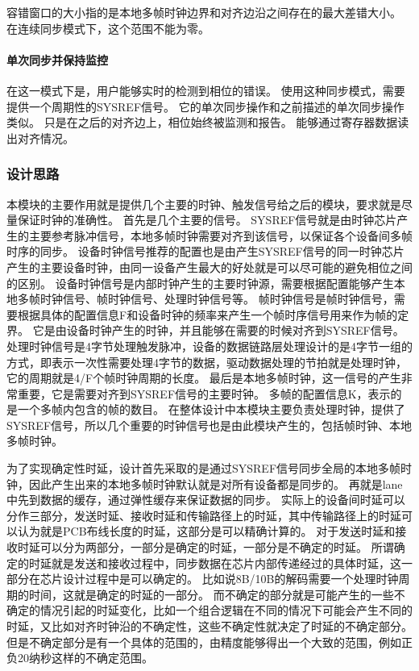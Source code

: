\documentclass[UTF8]{ctexart}
\begin{document}
容错窗口的大小指的是本地多帧时钟边界和对齐边沿之间存在的最大差错大小。
在连续同步模式下，这个范围不能为零。

\paragraph{单次同步并保持监控}

在这一模式下是，用户能够实时的检测到相位的错误。
使用这种同步模式，需要提供一个周期性的SYSREF信号。
它的单次同步操作和之前描述的单次同步操作类似。
只是在之后的对齐边上，相位始终被监测和报告。
能够通过寄存器数据读出对齐情况。

\subsubsection{设计思路}

本模块的主要作用就是提供几个主要的时钟、触发信号给之后的模块，要求就是尽量保证时钟的准确性。
首先是几个主要的信号。
SYSREF信号就是由时钟芯片产生的主要参考脉冲信号，本地多帧时钟需要对齐到该信号，以保证各个设备间多帧时序的同步。
设备时钟信号推荐的配置也是由产生SYSREF信号的同一时钟芯片产生的主要设备时钟，由同一设备产生最大的好处就是可以尽可能的避免相位之间的区别。
设备时钟信号是内部时钟产生的主要时钟源，需要根据配置能够产生本地多帧时钟信号、帧时钟信号、处理时钟信号等。
帧时钟信号是帧时钟信号，需要根据具体的配置信息F和设备时钟的频率来产生一个帧时序信号用来作为帧的定界。
它是由设备时钟产生的时钟，并且能够在需要的时候对齐到SYSREF信号。
处理时钟信号是4字节处理触发脉冲，设备的数据链路层处理设计的是4字节一组的方式，即表示一次性需要处理4字节的数据，驱动数据处理的节拍就是处理时钟，它的周期就是4/F个帧时钟周期的长度。
最后是本地多帧时钟，这一信号的产生非常重要，它是需要对齐到SYSREF信号的主要时钟。
多帧的配置信息K，表示的是一个多帧内包含的帧的数目。
在整体设计中本模块主要负责处理时钟，提供了SYSREF信号，所以几个重要的时钟信号也是由此模块产生的，包括帧时钟、本地多帧时钟。

为了实现确定性时延，设计首先采取的是通过SYSREF信号同步全局的本地多帧时钟，因此产生出来的本地多帧时钟默认就是对所有设备都是同步的。
再就是lane中先到数据的缓存，通过弹性缓存来保证数据的同步。
实际上的设备间时延可以分作三部分，发送时延、接收时延和传输路径上的时延，其中传输路径上的时延可以认为就是PCB布线长度的时延，这部分是可以精确计算的。
对于发送时延和接收时延可以分为两部分，一部分是确定的时延，一部分是不确定的时延。
所谓确定的时延就是发送和接收过程中，同步数据在芯片内部传递经过的具体时延，这一部分在芯片设计过程中是可以确定的。
比如说8B/10B的解码需要一个处理时钟周期的时间，这就是确定的时延的一部分。
而不确定的部分就是可能产生的一些不确定的情况引起的时延变化，比如一个组合逻辑在不同的情况下可能会产生不同的时延，又比如对齐时钟沿的不确定性，这些不确定性就决定了时延的不确定部分。
但是不确定部分是有一个具体的范围的，由精度能够得出一个大致的范围，例如正负20纳秒这样的不确定范围。
\end{document}

